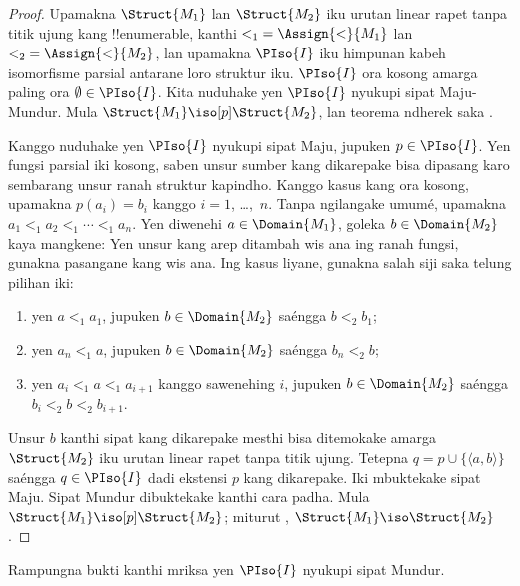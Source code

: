 \documentclass[../../../include/open-logic-section]{subfiles}
\begin{document}
\begin{proof}
  Upamakna $\Struct{M_1}$ lan
  $\Struct{M_2}$ iku urutan linear rapet
  tanpa titik ujung kang !!{enumerable},
  kanthi ${<_1} = \Assign{<}{M_1}$
  lan ${<_2} =
  \Assign{<}{M_2}$, lan upamakna
  $\PIso{I}$ iku himpunan kabeh
  isomorfisme parsial antarane loro
  struktur iku. $\PIso{I}$ ora kosong
  amarga paling ora $\emptyset \in \PIso{I}$.
  Kita nuduhake yen $\PIso{I}$
  nyukupi sipat Maju-Mundur.
  Mula $\Struct{M_1} \iso[p] \Struct{M_2}$,
  lan teorema ndherek saka
  .

  Kanggo nuduhake yen $\PIso{I}$
  nyukupi sipat Maju, jupuken
  $p \in \PIso{I}$.
  Yen fungsi parsial iki kosong,
  saben unsur sumber kang dikarepake
  bisa dipasang karo sembarang unsur
  ranah struktur kapindho.
  Kanggo kasus kang ora kosong, upamakna
  $p(a_i) = b_i$ kanggo
  $i = 1$, \dots,~$n$.
  Tanpa ngilangake umumé,
  upamakna $a_1 <_1 a_2 <_1 \cdots <_1
  a_n$. Yen diwenehi
  $a \in \Domain{M_1}$,
  goleka $b \in \Domain{M_2}$
  kaya mangkene:
  Yen unsur kang arep ditambah
  wis ana ing ranah fungsi,
  gunakna pasangane kang wis ana.
  Ing kasus liyane, gunakna
  salah siji saka telung
  pilihan iki:
  \begin{enumerate}
  \item yen $a <_1 a_1$, jupuken
    $b \in \Domain{M_2}$ saéngga
    $b <_2 b_1$;
  \item yen $a_n <_1 a$, jupuken
    $b \in \Domain{M_2}$ saéngga
    $b_n <_2 b$;
 \item yen $a_i <_1 a <_1 a_{i+1}$
   kanggo sawenehing $i$,
   jupuken $b \in \Domain{M_2}$
   saéngga $b_i <_2 b <_2 b_{i+1}$.
  \end{enumerate}
  Unsur $b$ kanthi sipat
  kang dikarepake mesthi
  bisa ditemokake amarga
  $\Struct{M_2}$ iku urutan
  linear rapet tanpa titik ujung.
  Tetepna $q = p \cup
  \{ \langle a, b \rangle \}$
  saéngga $q \in \PIso{I}$
  dadi ekstensi $p$
  kang dikarepake.
  Iki mbuktekake sipat Maju.
  Sipat Mundur dibuktekake
  kanthi cara padha.
  Mula $\Struct{M_1} \iso[p]
  \Struct{M_2}$; miturut
  ,
  $\Struct{M_1} \iso
  \Struct{M_2}$.
\end{proof}

\begin{prob}
  Rampungna bukti
  kanthi mriksa yen
  $\PIso{I}$ nyukupi
  sipat Mundur.
\end{prob}
\end{document}
